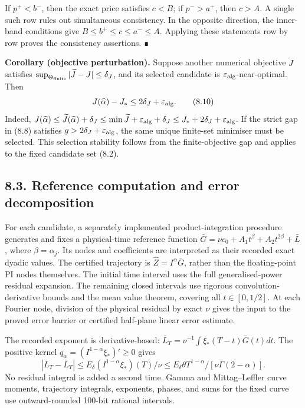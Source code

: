 \documentclass[a4paper,11pt]{article}
\begin{document}
If \(p^+<b^-\), then the exact price satisfies \(c<B\); if \(p^->a^+\), then \(c>A\). A single such row rules out simultaneous consistency. In the opposite direction, the inner-band conditions give \(B\le b^+\le c\le a^-\le A\). Applying these statements row by row proves the consistency assertions. ∎

\textbf{Corollary (objective perturbation).} Suppose another numerical objective \(\widetilde J\) satisfies
\(\sup_{\Theta_{\rm finite}}|\widetilde J-J|\le\delta_J\), and its selected candidate is \(\varepsilon_{\rm alg}\)-near-optimal. Then
\[
J(\widehat\alpha)-J_*
\le2\delta_J+\varepsilon_{\rm alg}.
\tag{8.10}
\]
Indeed, \(J(\widehat\alpha)\le\widetilde J(\widehat\alpha)+\delta_J
\le\min\widetilde J+\varepsilon_{\rm alg}+\delta_J
\le J_*+2\delta_J+\varepsilon_{\rm alg}\).
If the strict gap in (8.8) satisfies \(g>2\delta_J+\varepsilon_{\rm alg}\), the same unique finite-set minimiser must be selected. This selection stability follows from the finite-objective gap and applies to the fixed candidate set (8.2).

\subsection*{8.3. Reference computation and error decomposition}

For each candidate, a separately implemented product-integration procedure generates and fixes a physical-time reference function
\(\bar G=\nu c_0+A_1t^\beta+A_2t^{2\beta}+\bar L\), where \(\beta=\alpha_j\). Its nodes and coefficients are interpreted as their recorded exact dyadic values. The certified trajectory is \(\widehat Z=I^\alpha\bar G\), rather than the floating-point PI nodes themselves. The initial time interval uses the full generalised-power residual expansion. The remaining closed intervals use rigorous convolution-derivative bounds and the mean value theorem, covering all \(t\in[0,1/2]\). At each Fourier node, division of the physical residual by exact \(\nu\) gives the input to the proved error barrier or certified half-plane linear error estimate.

The recorded exponent is derivative-based: \(\bar L_T=\nu^{-1}\int\xi_*(T-t)\bar G(t)dt\). The positive kernel \(q_\alpha=(I^{1-\alpha}\xi_*)'\ge0\) gives
\[
|L_T-\bar L_T|
\le E_\delta(I^{1-\alpha}\xi_*)(T)/\nu
\le E_\delta\theta T^{1-\alpha}/[\nu\Gamma(2-\alpha)].
\tag{8.11}
\]
No residual integral is added a second time. Gamma and Mittag–Leffler curve moments, trajectory integrals, exponents, phases, and sums for the fixed curve use outward-rounded 100-bit rational intervals.
\end{document}
